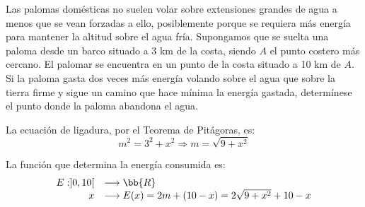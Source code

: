 \begin{ejercicio}
    Las palomas domésticas no suelen volar sobre extensiones grandes de agua a menos que se vean forzadas a ello, posiblemente porque se requiera más energía para mantener la altitud sobre el agua fría. Supongamos que se suelta una paloma desde un barco situado a 3 km de la costa, siendo $A$ el punto costero más cercano. El palomar se encuentra en un punto de la costa situado a 10 km de $A$. Si la paloma gasta dos veces más energía volando sobre el agua que sobre la tierra firme y sigue un camino que hace mínima la energía gastada, determínese el punto donde la paloma abandona el agua.
    \begin{figure}[H]
        \centering
    \end{figure}

    La ecuación de ligadura, por el Teorema de Pitágoras, es:
    \begin{equation*}
        m^2 = 3^2 + x^2 \Longrightarrow m=\sqrt{9+x^2}
    \end{equation*}

    La función que determina la energía consumida es:
    \begin{equation*}
        \begin{array}{rl}
            E:]0, 10[ & \longrightarrow \bb{R}\\
                    x & \longrightarrow E(x) = 2m + (10-x) = 2\sqrt{9+x^2} + 10-x
        \end{array}
    \end{equation*}


\end{ejercicio}

